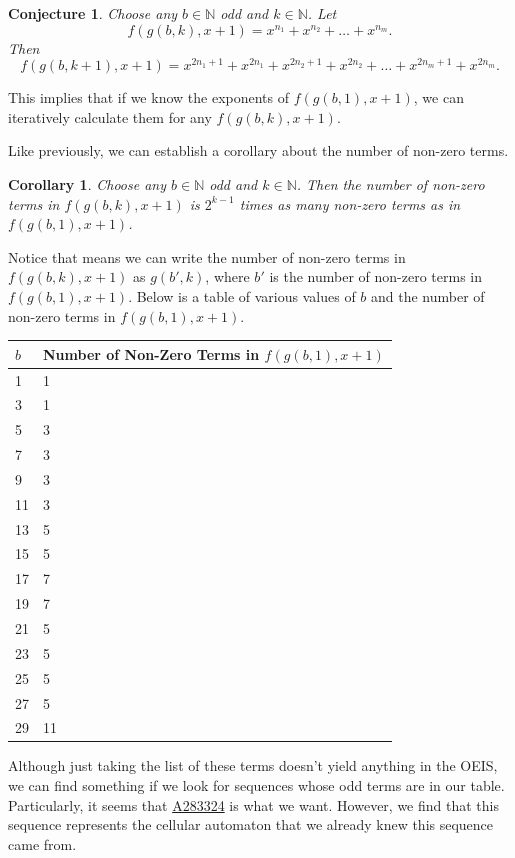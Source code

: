 \documentclass{article}
\newtheorem{corollary}{Corollary}
\newtheorem{conjecture}{Conjecture}
\newcommand{\N}{\mathbb{N}}
\begin{document}
	\newpage
	\begin{conjecture}
		Choose any $b \in \N$ odd and $k \in \N$.
		Let
		\begin{equation*}
			f(g(b,k),x+1) = x^{n_1} + x^{n_2} + \dots + x^{n_m}.
		\end{equation*}
		Then
		\begin{equation*}
			f(g(b,k+1),x+1) = x^{2n_1 + 1} + x^{2n_1} + x^{2n_2 + 1} + x^{2n_2} + \dots + x^{2n_m + 1} + x^{2n_m}.
		\end{equation*}
	\end{conjecture}
	This implies that if we know the exponents of $f(g(b,1),x+1)$, we can iteratively calculate them for any $f(g(b,k),x+1)$.
	
	Like previously, we can establish a corollary about the number of non-zero terms.
	\begin{corollary}
		Choose any $b \in \N$ odd and $k \in \N$.
		Then the number of non-zero terms in $f(g(b,k),x+1)$ is $2^{k-1}$ times as many non-zero terms as in $f(g(b,1),x+1)$.
	\end{corollary}
	Notice that means we can write the number of non-zero terms in $f(g(b,k),x+1)$ as $g(b',k)$, where $b'$ is the number of non-zero terms in $f(g(b,1),x+1)$.
	Below is a table of various values of $b$ and the number of non-zero terms in $f(g(b,1),x+1)$.
	
	\begin{table}[H]
		\centering
		\begin{tabular}{|l||l|}
			\hline
			$b$ & Number of Non-Zero Terms in $f(g(b,1),x+1)$ \\
			\hline\hline
			1 & 1 \\
			\hline
			3 & 1 \\
			\hline
			5 & 3 \\
			\hline
			7 & 3 \\
			\hline
			9 & 3 \\
			\hline
			11 & 3 \\
			\hline
			13 & 5 \\
			\hline
			15 & 5 \\
			\hline
			17 & 7 \\
			\hline
			19 & 7 \\
			\hline
			21 & 5 \\
			\hline
			23 & 5 \\
			\hline
			25 & 5 \\
			\hline
			27 & 5 \\
			\hline
			29 & 11 \\
			\hline
		\end{tabular}
	\end{table}
	Although just taking the list of these terms doesn't yield anything in the OEIS, we can find something if we look for sequences whose odd terms are in our table.
	Particularly, it seems that \href{https://oeis.org/A283324}{A283324} is what we want.
	However, we find that this sequence represents the cellular automaton that we already knew this sequence came from.
\end{document}
